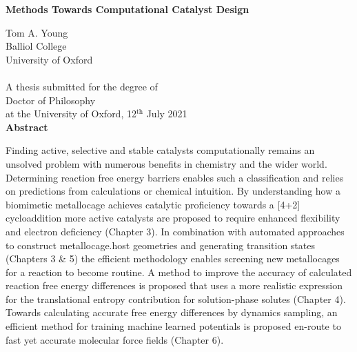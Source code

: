 \documentclass[main.tex]{subfiles}
\begin{document}
	\setcounter{page}{1}
	\begin{center}
		\begin{Large}
    		\null
			\vspace{-0.8cm}
			
			{\bfseries \Large \textsf{Methods Towards Computational Catalyst Design}}\\\vspace{0.3cm}
		\end{Large}
		\vspace{0.5cm}
		Tom A. Young\\
		Balliol College\\
		University of Oxford\\
		\ \\
		A thesis submitted for the degree of\\
		Doctor of Philosophy\\
		at the University of Oxford, 12${}^\text{th}$ July 2021\\
		\vspace{1cm}
		{\bfseries Abstract}
	\end{center}
    \null
    \vspace{-0.9cm}
	Finding active, selective and stable catalysts computationally remains an unsolved problem with numerous benefits in chemistry and the wider world. Determining reaction free energy barriers enables such a classification and relies on predictions from calculations or chemical intuition. By understanding how a biomimetic metallocage achieves catalytic proficiency towards a [4+2] cycloaddition more active catalysts are proposed to require enhanced flexibility and electron deficiency (Chapter 3). In combination with automated approaches to construct metallocage.host geometries and generating transition states (Chapters 3 \& 5) the efficient methodology enables screening new metallocages for a reaction to become routine. A method to improve the accuracy of calculated reaction free energy differences is proposed that uses a more realistic expression for the translational entropy contribution for solution-phase solutes (Chapter 4). Towards calculating accurate free energy differences by dynamics sampling, an efficient method for training machine learned potentials is proposed en-route to fast yet accurate molecular force fields (Chapter 6).
	\
	
\end{document}
